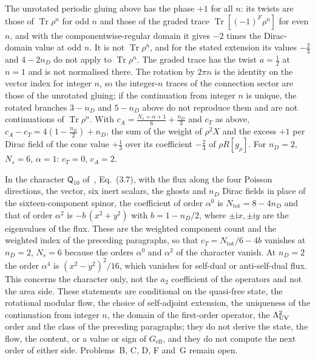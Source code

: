 The unrotated periodic gluing above has the phase \(+1\) for all \(n\): its twists are those of \(\operatorname{Tr}\rho^n\) for odd \(n\) and those of the graded trace \(\operatorname{Tr}[(-1)^F\rho^n]\) for even \(n\), and with the componentwise-regular domain it gives \(-2\) times the Dirac-domain value at odd \(n\). It is not \(\operatorname{Tr}\rho^n\), and for the stated extension its values \(-\tfrac23\) and \(4-2n_D\) do not apply to \(\operatorname{Tr}\rho^n\). The graded trace has the twist \(a=\tfrac12\) at \(n=1\) and is not normalised there. The rotation by \(2\pi n\) is the identity on the vector index for integer \(n\), so the integer-\(n\) traces of the connection sector are those of the unrotated gluing; if the continuation from integer \(n\) is unique, the rotated branches \(3-n_D\) and \(5-n_D\) above do not reproduce them and are not continuations of \(\operatorname{Tr}\rho^n\). With \(c_A=\tfrac{N_s+\alpha+1}6+\tfrac{n_D}3\) and \(c_T\) as above, \(c_A-c_T=4(1-\tfrac{n_D}2)+n_D\), the sum of the weight of \(\rho^2X\) and the excess \(+1\) per Dirac field of the cone value \(+\tfrac13\) over its coefficient \(-\tfrac23\) of \(\rho R[g_\rho]\). For \(n_D=2\), \(N_s=6\), \(\alpha=1\): \(c_T=0\), \(c_A=2\).

In the character \(\mathsf Q_{10}\) of~\cite{MantaSteinackerTran2024}, Eq.~(3.7), with the flux along the four Poisson directions, the vector, six inert scalars, the ghosts and \(n_D\) Dirac fields in place of the sixteen-component spinor, the coefficient of order \(\alpha^0\) is \(N_{\mathrm{tot}}=8-4n_D\) and that of order \(\alpha^2\) is \(-b\,(x^2+y^2)\) with \(b=1-n_D/2\), where \(\pm\mathrm ix,\pm\mathrm iy\) are the eigenvalues of the flux. These are the weighted component count and the weighted index of the preceding paragraphs, so that \(c_T=N_{\mathrm{tot}}/6-4b\) vanishes at \(n_D=2\), \(N_s=6\) because the orders \(\alpha^0\) and \(\alpha^2\) of the character vanish. At \(n_D=2\) the order \(\alpha^4\) is \((x^2-y^2)^2/16\), which vanishes for self-dual or anti-self-dual flux. This concerns the character only, not the \(a_2\) coefficient of the operators and not the area side. These statements are conditional on the quasi-free state, the rotational modular flow, the choice of self-adjoint extension, the uniqueness of the continuation from integer \(n\), the domain of the first-order operator, the \(\Lambda_{\mathrm{UV}}^2\) order and the class of the preceding paragraphs; they do not derive the state, the flow, the content, or a value or sign of \(G_{\mathrm{eff}}\), and they do not compute the next order of either side. Problems~B, C, D, F and~G remain open.
